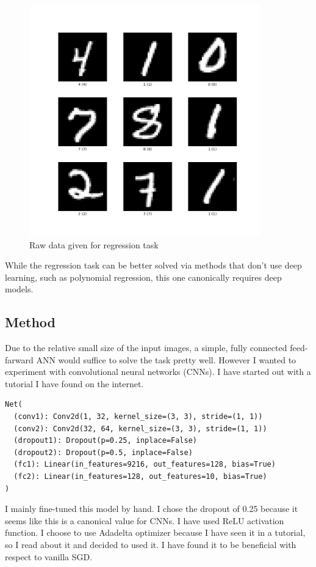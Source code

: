 \documentclass{article}
\begin{document}
\begin{figure}[H]
  \begin{center}
    \includegraphics[width=10cm]{mnist_task/imgs/mnist_raw_data.png}
    \caption{Raw data given for regression task}\label{mnist_raw_data}
  \end{center}
\end{figure}

While the regression task can be better solved via methods that don't use deep learning, such as polynomial regression, this one canonically requires deep models. 

\subsection{Method}
Due to the relative small size of the input images, a simple, fully connected feed-farward ANN would suffice to solve the task pretty well. However I wanted to experiment with convolutional neural networks (CNNs). I have started out with a tutorial I have found on the internet.
\begin{lstlisting}
Net(
  (conv1): Conv2d(1, 32, kernel_size=(3, 3), stride=(1, 1))
  (conv2): Conv2d(32, 64, kernel_size=(3, 3), stride=(1, 1))
  (dropout1): Dropout(p=0.25, inplace=False)
  (dropout2): Dropout(p=0.5, inplace=False)
  (fc1): Linear(in_features=9216, out_features=128, bias=True)
  (fc2): Linear(in_features=128, out_features=10, bias=True)
)
\end{lstlisting}
I mainly fine-tuned this model by hand. I chose the dropout of 0.25 because it seems like this is a canonical value for CNNs. I have used ReLU activation function. I choose to use Adadelta optimizer because I have seen it in a tutorial, so I read about it and decided to used it. I have found it to be beneficial with respect to vanilla SGD.
\end{document}
